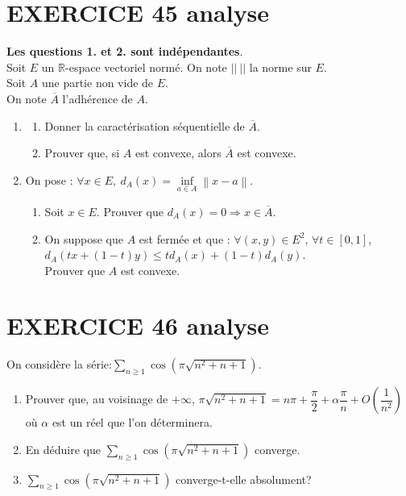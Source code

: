 \documentclass[10pt,oneside]{article}
\begin{document}
\begin{flushleft}
\section*{EXERCICE 45 \:analyse }


\textbf{ Les questions 1. et 2. sont indépendantes}.\\
Soit $E$ un $\mathbb{R}$-espace vectoriel normé.  On note $||\:||$ la norme sur $E$.\\

Soit $A$ une partie non vide de $E$.\\
 On note $\overline{A}$  l'adhérence de $A$.
\begin{enumerate}

\item 

\begin{enumerate}
\item
 Donner la caractérisation séquentielle de $\overline{A}$. 

\item Prouver que, si $A$ est convexe, alors $\overline{A}$ est convexe.
\end{enumerate}
\item 
On pose : $\forall x \in E,\:{d_A}(x) = \mathop {\inf }\limits_{a \in A} \left\| {x - a} \right\|$.
\begin{enumerate}

\item Soit $x \in{E}$. Prouver que $d_{A}(x) = 0 \Longrightarrow x \in \overline A $.
\item On suppose que $A$ est fermée et que :  $\forall (x,y) \in{E^2}$, $\forall t\in{[0,1]}$, $d_A(tx+(1-t)y)\leqslant td_A(x)+(1-t)d_A(y)$.\\
Prouver que $A$ est convexe.

\end{enumerate}
\end{enumerate}


\section*{EXERCICE 46 \:analyse }



On considère la série:$\displaystyle\sum\limits_{n\geqslant1}{}\cos \left( \pi \sqrt{n^2+n+1}\right) $. 
\begin{enumerate}
\item
Prouver que, au voisinage de $+\infty$, $\pi\sqrt{n^2+n+1}=n\pi+\dfrac{\pi}{2}+\alpha\dfrac{\pi}{n}+O\left(\dfrac{1}{n^2} \right)$ où $\alpha$ est un réel que l'on déterminera.
\item
En déduire que $\displaystyle\sum\limits_{n\geqslant 1}{}\cos \left( \pi \sqrt{n^2+n+1}\right) $ converge.
\item
 $\displaystyle\sum\limits_{n\geqslant 1}{}\cos \left( \pi \sqrt{n^2+n+1}\right) $ converge-t-elle absolument?


\end{enumerate}
\end{flushleft}
\end{document}

